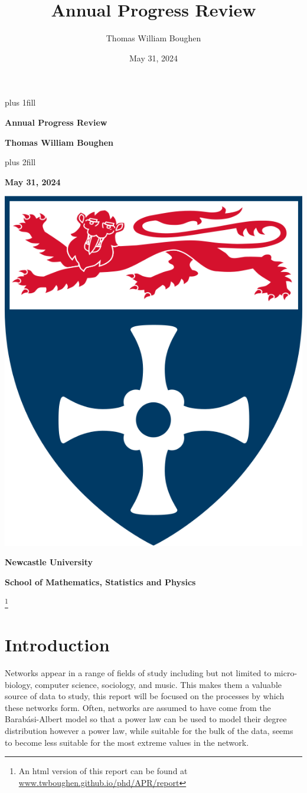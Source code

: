 \documentclass[
  10pt,
  a4paper,
]{scrreprt}
\title{Annual Progress Review}
\author{Thomas William Boughen}
\date{May 31, 2024}
\renewcommand*\contentsname{Table of contents}
\newcommand\contentsname{Table of contents}
\theoremstyle{definition}
\theoremstyle{plain}
\theoremstyle{plain}
\theoremstyle{remark}
\begin{document}
\cleardoublepage
\thispagestyle{empty}
{\centering
\hbox{}\vskip 0cm plus 1fill
{\Huge\bfseries Annual Progress Review \par}
\vspace{12ex}
{\Large\bfseries Thomas William Boughen \par}
\vspace{3ex}
\vskip 0cm plus 2fill
\vspace{3ex}
{\bfseries\large May 31, 2024 \par}
\vspace{12ex}
{\includegraphics[width=0.1\linewidth]{"imgs/University_of_Newcastle_Coat_of_Arms.png"}\par}
%
%
{\bfseries\large Newcastle University \par}
\vspace{3ex}
%
{\bfseries\large School of Mathematics, Statistics and Physics \par}
%
\vspace{12ex}
\footnote{An html version of this report can be found at \url{www.twboughen.github.io/phd/APR/report}}
\justifying
\noindent\ifdefined\Shaded\renewenvironment{Shaded}{\begin{tcolorbox}[borderline west={3pt}{0pt}{shadecolor}, enhanced, interior hidden, boxrule=0pt, breakable, sharp corners, frame hidden]}{\end{tcolorbox}}\fi

\renewcommand*\contentsname{Table of contents}
{
\hypersetup{linkcolor=}
\setcounter{tocdepth}{1}
\tableofcontents
}
\hypertarget{sec-int}{%
\chapter{Introduction}\label{sec-int}}

Networks appear in a range of fields of study including but not limited
to micro-biology, computer science, sociology, and music. This makes
them a valuable source of data to study, this report will be focused on
the processes by which these networks form. Often, networks are assumed
to have come from the Barabási-Albert model so that a power law can be
used to model their degree distribution however a power law, while
suitable for the bulk of the data, seems to become less suitable for the
most extreme values in the network.

}
\end{document}
